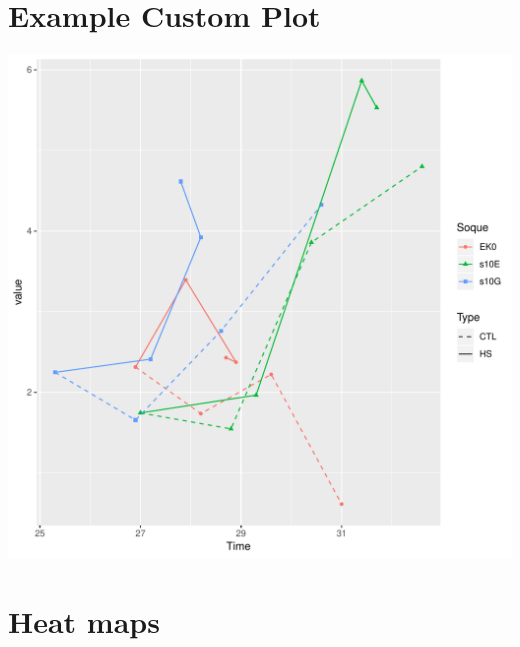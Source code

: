 \documentclass{article}\usepackage[]{graphicx}\usepackage[]{color}
\newenvironment{knitrout}{}{} %
\begin{document}
\clearpage






\section{Example Custom Plot}
\begin{knitrout}
\color{fgcolor}

{\centering \includegraphics[width=1\linewidth]{figure/minimal-custom_plots-1} 

}



\end{knitrout}
\clearpage





\section{Heat maps}
\end{document}
